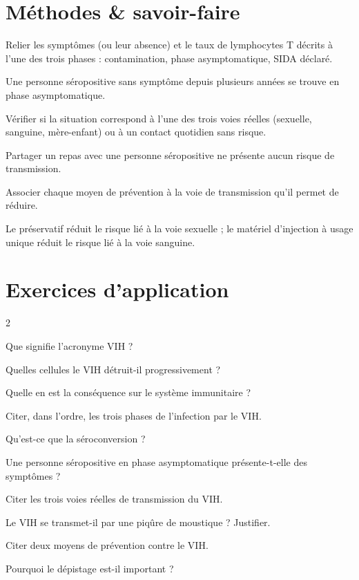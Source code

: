 \section{Méthodes \& savoir-faire}

Relier les symptômes (ou leur absence) et le taux de lymphocytes T décrits à l'une des
trois phases : contamination, phase asymptomatique, SIDA déclaré.
\begin{exemple}
Une personne séropositive sans symptôme depuis plusieurs années se trouve en phase
asymptomatique.
\end{exemple}

Vérifier si la situation correspond à l'une des trois voies réelles (sexuelle, sanguine,
mère-enfant) ou à un contact quotidien sans risque.
\begin{exemple}
Partager un repas avec une personne séropositive ne présente aucun risque de
transmission.
\end{exemple}

Associer chaque moyen de prévention à la voie de transmission qu'il permet de réduire.
\begin{exemple}
Le préservatif réduit le risque lié à la voie sexuelle ; le matériel d'injection à usage
unique réduit le risque lié à la voie sanguine.
\end{exemple}

\section{Exercices d'application}
\begin{multicols}{2}

\exo{} Que signifie l'acronyme VIH ?

\exo{} Quelles cellules le VIH détruit-il progressivement ?

\exo{} Quelle en est la conséquence sur le système immunitaire ?

\exo{} Citer, dans l'ordre, les trois phases de l'infection par le VIH.

\exo{} Qu'est-ce que la séroconversion ?

\exo{} Une personne séropositive en phase asymptomatique présente-t-elle des
symptômes ?

\exo{} Citer les trois voies réelles de transmission du VIH.

\exo{} Le VIH se transmet-il par une piqûre de moustique ? Justifier.

\exo{} Citer deux moyens de prévention contre le VIH.

\exo{} Pourquoi le dépistage est-il important ?

\end{multicols}

